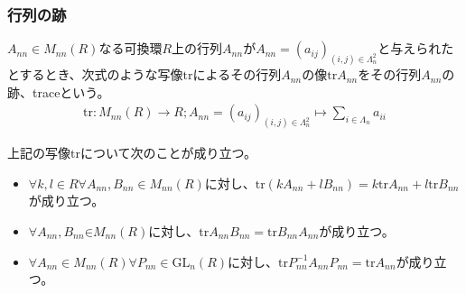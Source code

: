 \documentclass[dvipdfmx]{jsarticle}
\begin{document}
\subsubsection{行列の跡}%
\begin{dfn}
$A_{nn} \in M_{nn}(R)$なる可換環$R$上の行列$A_{nn}$が$A_{nn} = \left( a_{ij} \right)_{(i,j) \in \varLambda_{n}^{2}}$と与えられたとするとき、次式のような写像$\mathrm{tr} $によるその行列$A_{nn}$の像${\mathrm{tr} }A_{nn}$をその行列$A_{nn}$の跡、traceという。
\begin{align*}
\mathrm{tr} :M_{nn}(R) \rightarrow R;A_{nn} = \left( a_{ij} \right)_{(i,j) \in \varLambda_{n}^{2}} \mapsto \sum_{i \in \varLambda_{n}} a_{ii}
\end{align*}
\end{dfn}
\begin{thm}\label{2.1.3.7}
上記の写像$\mathrm{tr} $について次のことが成り立つ。
\begin{itemize}
\item
  $\forall k,l \in R\forall A_{nn},B_{nn} \in M_{nn}(R)$に対し、${\mathrm{tr} }\left( kA_{nn} + lB_{nn} \right) = k{\mathrm{tr} }A_{nn} + l{\mathrm{tr} }B_{nn}$が成り立つ。
\item
  $\forall A_{nn},B_{nn}\text{∈}M_{nn}(R)$に対し、${\mathrm{tr} }{A_{nn}B_{nn}} = {\mathrm{tr} }{B_{nn}A_{nn}}$が成り立つ。
\item
  $\forall A_{nn} \in M_{nn}(R)\forall P_{nn} \in {\mathrm{GL}}_{n}(R)$に対し、${\mathrm{tr} }{P_{nn}^{- 1}A_{nn}P_{nn}} = {\mathrm{tr} }A_{nn}$が成り立つ。
\end{itemize}
\end{thm}
\end{document}
